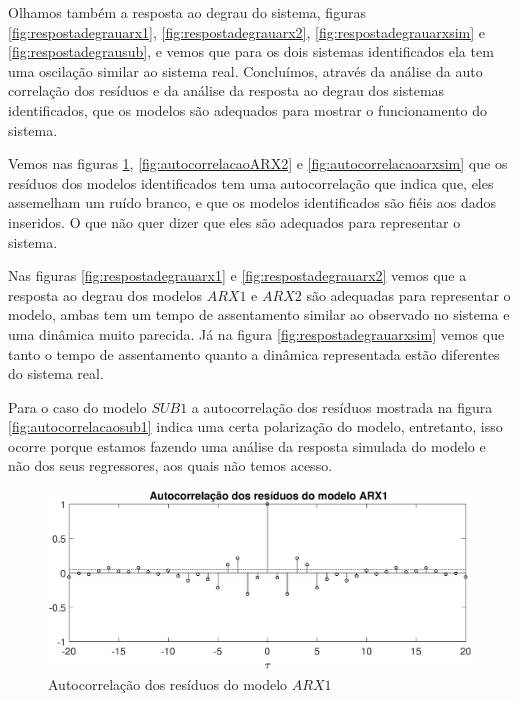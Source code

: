 Olhamos também a resposta ao degrau do sistema, figuras \ref{fig:respostadegrauarx1}, \ref{fig:respostadegrauarx2}, \ref{fig:respostadegrauarxsim} e  \ref{fig:respostadegrausub}, e vemos que para os dois sistemas identificados ela tem uma oscilação similar ao sistema real. Concluímos, através da análise da auto correlação dos resíduos e da análise da resposta ao degrau dos sistemas identificados, que os modelos são adequados para mostrar o funcionamento do sistema.

Vemos nas figuras \ref{fig:autocorrelacaoARX1}, \ref{fig:autocorrelacaoARX2} e \ref{fig:autocorrelacaoarxsim} que os resíduos dos modelos identificados tem uma autocorrelação que indica que, eles assemelham um ruído branco, e que os modelos identificados são fiéis aos dados inseridos. O que não quer dizer que eles são adequados para representar o sistema.


Nas figuras \ref{fig:respostadegrauarx1} e \ref{fig:respostadegrauarx2} vemos que a resposta ao degrau dos modelos $ARX1$ e $ARX2$ são adequadas para representar o modelo, ambas tem um tempo de assentamento similar ao observado no sistema e uma dinâmica muito parecida. Já na figura \ref{fig:respostadegrauarxsim} vemos que tanto o tempo de assentamento quanto a dinâmica representada estão diferentes do sistema real.


Para o caso do modelo $SUB1$ a autocorrelação dos resíduos mostrada na figura \ref{fig:autocorrelacaosub1} indica uma certa polarização do modelo, entretanto, isso ocorre porque estamos fazendo uma análise da resposta simulada do modelo e não dos seus regressores, aos quais não temos acesso.

\begin{figure}[htb]
	\centering
	\includegraphics[width=1\linewidth]{autocorrelacaoARX1}
	\caption[Autocorrelação dos resíduos do modelo $ARX1$]{Autocorrelação dos resíduos do modelo $ARX1$}
	\label{fig:autocorrelacaoARX1}
\end{figure}

